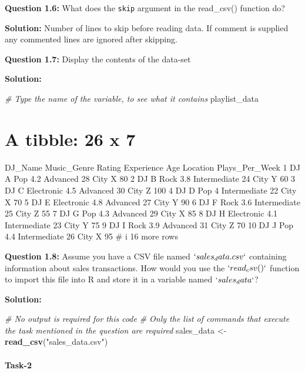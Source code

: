 \documentclass[
]{article}
\newenvironment{Shaded}{\begin{snugshade}}{\end{snugshade}}
\newcommand{\CommentTok}[1]{\textcolor[rgb]{0.56,0.35,0.01}{\textit{#1}}}
\newcommand{\FunctionTok}[1]{\textcolor[rgb]{0.13,0.29,0.53}{\textbf{#1}}}
\newcommand{\NormalTok}[1]{#1}
\newcommand{\OtherTok}[1]{\textcolor[rgb]{0.56,0.35,0.01}{#1}}
\newcommand{\StringTok}[1]{\textcolor[rgb]{0.31,0.60,0.02}{#1}}
\begin{document}
\textbf{Question 1.6:} What does the \texttt{skip} argument in the
read\_csv() function do?

\textbf{Solution:} Number of lines to skip before reading data. If
comment is supplied any commented lines are ignored after skipping.

\textbf{Question 1.7:} Display the contents of the data-set

\textbf{Solution:}

\begin{Shaded}
\begin{Highlighting}[]
\CommentTok{\# Type the name of the variable, to see what it contains}
\NormalTok{playlist\_data}
\end{Highlighting}
\end{Shaded}

\hypertarget{a-tibble-26-x-7-1}{%
\section{A tibble: 26 x 7}\label{a-tibble-26-x-7-1}}

DJ\_Name Music\_Genre Rating Experience Age Location Plays\_Per\_Week 1
DJ A Pop 4.2 Advanced 28 City X 80 2 DJ B Rock 3.8 Intermediate 24 City
Y 60 3 DJ C Electronic 4.5 Advanced 30 City Z 100 4 DJ D Pop 4
Intermediate 22 City X 70 5 DJ E Electronic 4.8 Advanced 27 City Y 90 6
DJ F Rock 3.6 Intermediate 25 City Z 55 7 DJ G Pop 4.3 Advanced 29 City
X 85 8 DJ H Electronic 4.1 Intermediate 23 City Y 75 9 DJ I Rock 3.9
Advanced 31 City Z 70 10 DJ J Pop 4.4 Intermediate 26 City X 95 \# i 16
more rows

\textbf{Question 1.8:} Assume you have a CSV file named
\(`sales_data.csv`\) containing information about sales transactions.
How would you use the \(`read_csv()`\) function to import this file into
R and store it in a variable named \(`sales_data`\)?

\textbf{Solution:}

\begin{Shaded}
\begin{Highlighting}[]
\CommentTok{\# No output is required for this code}
\CommentTok{\# Only the list of commands that execute the task mentioned in the question are required}
\NormalTok{sales\_data }\OtherTok{\textless{}{-}} \FunctionTok{read\_csv}\NormalTok{(}\StringTok{"sales\_data.csv"}\NormalTok{)}
\end{Highlighting}
\end{Shaded}

\hypertarget{task-2}{%
\paragraph{Task-2}\label{task-2}}
\end{document}
